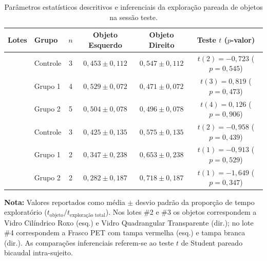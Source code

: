 \begin{table}[tbp]
    \centering
    \small
    \setlength{\tabcolsep}{3.5pt}
    \caption{Parâmetros estatísticos descritivos e inferenciais da exploração pareada de objetos na sessão teste.}
    \label{tab:estatistica_preferencia_lotes}
    \begin{adjustbox}{max width=0.95\textwidth}
        \begin{tabular}{llcccc}
            \toprule
            \textbf{Lotes} & \textbf{Grupo} & \textbf{$n$} & \textbf{Objeto Esquerdo} & \textbf{Objeto Direito} & \textbf{Teste $t$ ($p$-valor)}    \\
            \midrule
                           & Controle       & 3            & $0{,}453 \pm 0{,}112$    & $0{,}547 \pm 0{,}112$   & $t(2) = -0{,}723$ ($p = 0{,}545$) \\
                           & Grupo 1        & 4            & $0{,}529 \pm 0{,}072$    & $0{,}471 \pm 0{,}072$   & $t(3) = 0{,}819$ ($p = 0{,}473$)  \\
                           & Grupo 2        & 5            & $0{,}504 \pm 0{,}078$    & $0{,}496 \pm 0{,}078$   & $t(4) = 0{,}126$ ($p = 0{,}906$)  \\
            \midrule
                           & Controle       & 3            & $0{,}425 \pm 0{,}135$    & $0{,}575 \pm 0{,}135$   & $t(2) = -0{,}958$ ($p = 0{,}439$) \\
                           & Grupo 1        & 2            & $0{,}347 \pm 0{,}238$    & $0{,}653 \pm 0{,}238$   & $t(1) = -0{,}913$ ($p = 0{,}529$) \\
                           & Grupo 2        & 2            & $0{,}282 \pm 0{,}187$    & $0{,}718 \pm 0{,}187$   & $t(1) = -1{,}649$ ($p = 0{,}347$) \\
            \bottomrule
        \end{tabular}
    \end{adjustbox}
    \vspace{0.2em}
    \begin{minipage}{0.95\textwidth}
        \footnotesize \textbf{Nota:} Valores reportados como média $\pm$ desvio padrão da proporção de tempo exploratório ($t_{\text{objeto}} / t_{\text{exploração total}}$). Nos lotes \#2 e \#3 os objetos correspondem a Vidro Cilíndrico Roxo (esq.) e Vidro Quadrangular Transparente (dir.); no lote \#4 correspondem a Frasco PET com tampa vermelha (esq.) e tampa branca (dir.). As comparações inferenciais referem-se ao teste $t$ de Student pareado bicaudal intra-sujeito.
    \end{minipage}
\end{table}
